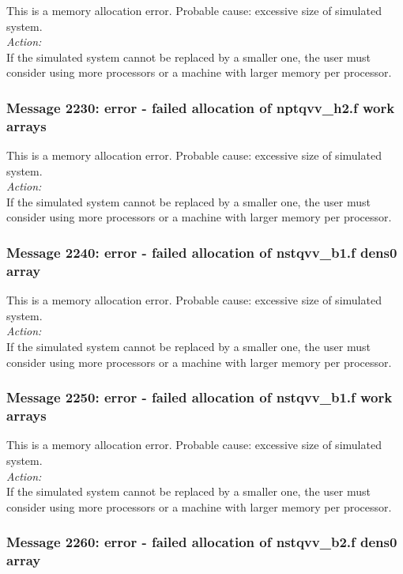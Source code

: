This is a memory allocation error. Probable cause: excessive size of
simulated system. \\

\noindent
{\em Action:}\\
If the simulated system cannot be replaced by a smaller one, the user
must consider using more processors or a machine with larger memory
per processor.

\subsubsection*{Message 2230: error - failed allocation of nptqvv\_h2.f
work arrays}

This is a memory allocation error. Probable cause: excessive size of
simulated system. \\

\noindent
{\em Action:}\\
If the simulated system cannot be replaced by a smaller one, the user
must consider using more processors or a machine with larger memory
per processor.

\subsubsection*{Message 2240: error - failed allocation of nstqvv\_b1.f
dens0 array}

This is a memory allocation error. Probable cause: excessive size of
simulated system. \\

\noindent
{\em Action:}\\
If the simulated system cannot be replaced by a smaller one, the user
must consider using more processors or a machine with larger memory
per processor.

\subsubsection*{Message 2250: error - failed allocation of nstqvv\_b1.f
work arrays}

This is a memory allocation error. Probable cause: excessive size of
simulated system. \\

\noindent
{\em Action:}\\
If the simulated system cannot be replaced by a smaller one, the user
must consider using more processors or a machine with larger memory
per processor.

\subsubsection*{Message 2260: error - failed allocation of nstqvv\_b2.f
dens0 array}

